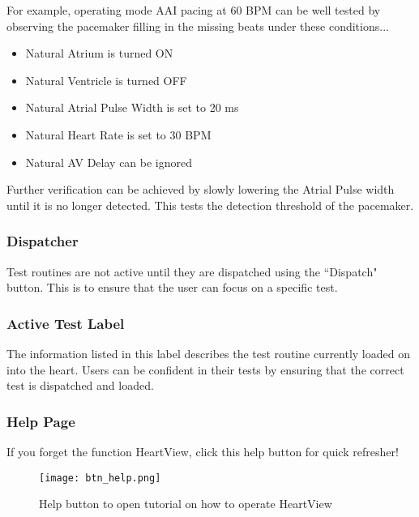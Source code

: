 \documentclass[11pt,fleqn]{book} %
\begin{document}
For example, operating mode AAI pacing at 60 \ac{BPM}  can be well tested by observing the pacemaker filling in the missing beats under these conditions... \\

\begin{itemize}
	\item Natural Atrium is turned ON
	\item Natural Ventricle is turned OFF
	\item Natural Atrial Pulse Width is set to 20 ms
	\item Natural Heart Rate is set to 30 BPM
	\item Natural AV Delay can be ignored 
\end{itemize}

Further verification can be achieved by slowly lowering the Atrial Pulse width until it is no longer detected. This tests the detection threshold of the pacemaker.

\subsubsection*{Dispatcher} 
Test routines are not active until they are dispatched using the ``Dispatch" button. This is to ensure that the user can focus on a specific test. 

\subsubsection*{Active Test Label} 
The information listed in this label describes the test routine currently loaded on into the heart. Users can be confident in their tests by ensuring that the correct test is dispatched and loaded. 

\subsubsection*{Help Page} 
If you forget the function HeartView, click this help button for quick refresher! 

\begin{figure}[h]
	\centering\texttt{[image: btn\_help.png]}
	\caption{Help button to open tutorial on how to operate HeartView}
	\label{fig:button_help} %
\end{figure}
\end{document}
